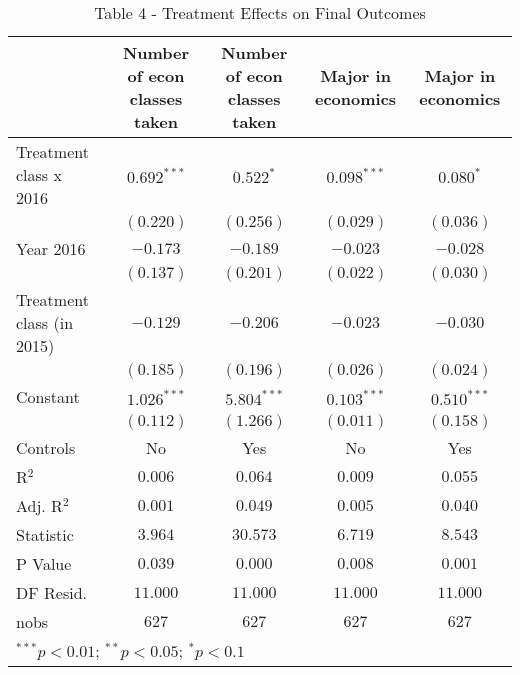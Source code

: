 
\begin{table}
\caption{Table 4 - Treatment Effects on Final Outcomes}
\begin{center}
\begin{tabular}{l c c c c}
\hline
 & Number of econ classes taken & Number of econ classes taken & Major in economics & Major in economics \\
\hline
Treatment class x 2016    & $0.692^{***}$ & $0.522^{*}$   & $0.098^{***}$ & $0.080^{*}$   \\
                          & $(0.220)$     & $(0.256)$     & $(0.029)$     & $(0.036)$     \\
Year 2016                 & $-0.173$      & $-0.189$      & $-0.023$      & $-0.028$      \\
                          & $(0.137)$     & $(0.201)$     & $(0.022)$     & $(0.030)$     \\
Treatment class (in 2015) & $-0.129$      & $-0.206$      & $-0.023$      & $-0.030$      \\
                          & $(0.185)$     & $(0.196)$     & $(0.026)$     & $(0.024)$     \\
Constant                  & $1.026^{***}$ & $5.804^{***}$ & $0.103^{***}$ & $0.510^{***}$ \\
                          & $(0.112)$     & $(1.266)$     & $(0.011)$     & $(0.158)$     \\
\hline
Controls                  & No            & Yes           & No            & Yes           \\
R$^2$                     & $0.006$       & $0.064$       & $0.009$       & $0.055$       \\
Adj. R$^2$                & $0.001$       & $0.049$       & $0.005$       & $0.040$       \\
Statistic                 & $3.964$       & $30.573$      & $6.719$       & $8.543$       \\
P Value                   & $0.039$       & $0.000$       & $0.008$       & $0.001$       \\
DF Resid.                 & $11.000$      & $11.000$      & $11.000$      & $11.000$      \\
nobs                      & $627$         & $627$         & $627$         & $627$         \\
\hline
\multicolumn{5}{l}{\scriptsize{$^{***}p<0.01$; $^{**}p<0.05$; $^{*}p<0.1$}}
\end{tabular}
\label{table:coefficients}
\end{center}
\end{table}
